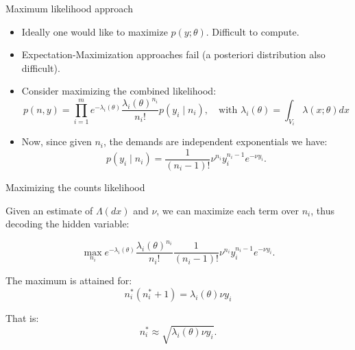 \documentclass[aspectratio=169]{beamer}
\begin{document}
\begin{frame}{Maximum likelihood approach}

	\begin{itemize}
		\item Ideally one would like to maximize $p(y;\theta)$. Difficult to compute.
		\item Expectation-Maximization approaches fail (a posteriori distribution also difficult).
		\item Consider maximizing the combined likelihood:
		\begin{equation*}
			p(n,y) = \prod_{i=1}^m e^{-\lambda_i(\theta)}\frac{\lambda_i(\theta)^{n_i}}{n_i!}p(y_i\mid n_i), \quad \text{with }\lambda_i(\theta) = \int_{V_i} \lambda(x;\theta)dx
		\end{equation*}
		\item Now, since given $n_i$, the demands are independent exponentials we have:
		\begin{equation*}
			p(y_i\mid n_i) = \frac{1}{(n_i-1)!}\nu^{n_i}y_i^{n_i-1}e^{-\nu y_i}.
		\end{equation*}
	\end{itemize}
\end{frame}

\begin{frame}{Maximizing the counts likelihood}

Given an estimate of $\Lambda(dx)$ and $\nu$, we can maximize \alert{each term} over $n_i$, thus decoding the hidden variable:

\begin{equation*}
	\max_{n_i} e^{-\lambda_i(\theta)}\frac{\lambda_i(\theta)^{n_i}}{n_i!} \frac{1}{(n_i-1)!}\nu^{n_i} y_i^{n_i-1}e^{-\nu y_i}.
\end{equation*}

The maximum is attained for:
\begin{equation*}
	n_i^*(n_i^*+1) = \lambda_i(\theta) \nu y_i
\end{equation*}

That is:
\begin{equation*}
	n_i^* \approx \sqrt{\lambda_i(\theta) \nu y_i}.
\end{equation*}
\end{frame}
\end{document}
